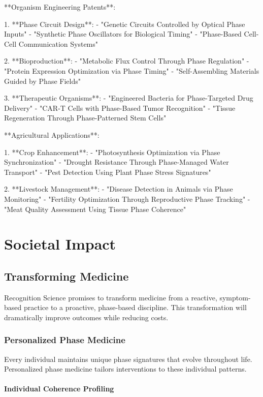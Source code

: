 \documentclass[12pt,a4paper]{report}
\begin{document}
**Organism Engineering Patents**:

1. **Phase Circuit Design**:
   - "Genetic Circuits Controlled by Optical Phase Inputs"
   - "Synthetic Phase Oscillators for Biological Timing"
   - "Phase-Based Cell-Cell Communication Systems"

2. **Bioproduction**:
   - "Metabolic Flux Control Through Phase Regulation"
   - "Protein Expression Optimization via Phase Timing"
   - "Self-Assembling Materials Guided by Phase Fields"

3. **Therapeutic Organisms**:
   - "Engineered Bacteria for Phase-Targeted Drug Delivery"
   - "CAR-T Cells with Phase-Based Tumor Recognition"
   - "Tissue Regeneration Through Phase-Patterned Stem Cells"

**Agricultural Applications**:

1. **Crop Enhancement**:
   - "Photosynthesis Optimization via Phase Synchronization"
   - "Drought Resistance Through Phase-Managed Water Transport"
   - "Pest Detection Using Plant Phase Stress Signatures"

2. **Livestock Management**:
   - "Disease Detection in Animals via Phase Monitoring"
   - "Fertility Optimization Through Reproductive Phase Tracking"
   - "Meat Quality Assessment Using Tissue Phase Coherence"

\part{Societal Impact}

\chapter{Transforming Medicine}

Recognition Science promises to transform medicine from a reactive, symptom-based practice to a proactive, phase-based discipline. This transformation will dramatically improve outcomes while reducing costs.

\section{Personalized Phase Medicine}

Every individual maintains unique phase signatures that evolve throughout life. Personalized phase medicine tailors interventions to these individual patterns.

\subsection{Individual Coherence Profiling}
\end{document}
